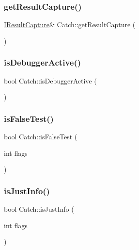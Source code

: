 \hypertarget{namespace_catch_aff60c1de6ac6cea30175d70e33d83c8e}{}\label{namespace_catch_aff60c1de6ac6cea30175d70e33d83c8e} 
\subsubsection{\texorpdfstring{get\+Result\+Capture()}{getResultCapture()}}
{\footnotesize\ttfamily \hyperlink{struct_catch_1_1_i_result_capture}{I\+Result\+Capture}\& Catch\+::get\+Result\+Capture (\begin{DoxyParamCaption}{ }\end{DoxyParamCaption})}

\hypertarget{namespace_catch_ab079497368fb1df25af39ad494d2a241}{}\label{namespace_catch_ab079497368fb1df25af39ad494d2a241} 
\subsubsection{\texorpdfstring{is\+Debugger\+Active()}{isDebuggerActive()}}
{\footnotesize\ttfamily bool Catch\+::is\+Debugger\+Active (\begin{DoxyParamCaption}{ }\end{DoxyParamCaption})}

\hypertarget{namespace_catch_a93ef4e3e307a2021ca0d41b32c0e54b0}{}\label{namespace_catch_a93ef4e3e307a2021ca0d41b32c0e54b0} 
\subsubsection{\texorpdfstring{is\+False\+Test()}{isFalseTest()}}
{\footnotesize\ttfamily bool Catch\+::is\+False\+Test (\begin{DoxyParamCaption}\item[{int}]{flags }\end{DoxyParamCaption})\hspace{0.3cm}{\ttfamily [inline]}}

\hypertarget{namespace_catch_a54b01af61673a3e1f21f31713639b180}{}\label{namespace_catch_a54b01af61673a3e1f21f31713639b180} 
\subsubsection{\texorpdfstring{is\+Just\+Info()}{isJustInfo()}}
{\footnotesize\ttfamily bool Catch\+::is\+Just\+Info (\begin{DoxyParamCaption}\item[{int}]{flags }\end{DoxyParamCaption})\hspace{0.3cm}{\ttfamily [inline]}}

